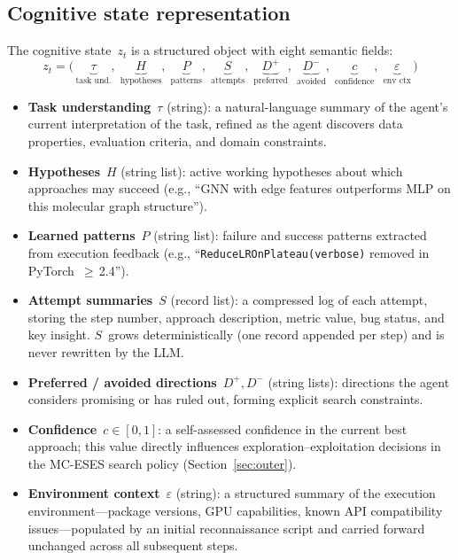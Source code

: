 \documentclass{article} %
\newcommand{\zt}{z_t}
\begin{document}
\subsection{Cognitive state representation}
\label{sec:cognitive_state}

The cognitive state~$\zt$ is a structured object with eight semantic fields:
\begin{equation}
  \zt = \big(\,
  \underbrace{\tau}_{\text{task und.}},\;
  \underbrace{H}_{\text{hypotheses}},\;
  \underbrace{P}_{\text{patterns}},\;
  \underbrace{S}_{\text{attempts}},\;
  \underbrace{D^{+}}_{\text{preferred}},\;
  \underbrace{D^{-}}_{\text{avoided}},\;
  \underbrace{c}_{\text{confidence}},\;
  \underbrace{\varepsilon}_{\text{env ctx}}
  \,\big)
  \label{eq:state}
\end{equation}

\begin{itemize}
  \item \textbf{Task understanding}~$\tau$ (string): a natural-language summary
  of the agent's current interpretation of the task, refined as the agent
  discovers data properties, evaluation criteria, and domain constraints.
  \item \textbf{Hypotheses}~$H$ (string list): active working hypotheses about
  which approaches may succeed (e.g., ``GNN with edge features outperforms MLP
  on this molecular graph structure'').
  \item \textbf{Learned patterns}~$P$ (string list): failure and success
  patterns extracted from execution feedback (e.g.,
  ``\texttt{ReduceLROnPlateau(verbose)} removed in PyTorch~$\geq$\,2.4'').
  \item \textbf{Attempt summaries}~$S$ (record list): a compressed log of each
  attempt, storing the step number, approach description, metric value,
  bug status, and key insight. $S$~grows deterministically (one record appended
  per step) and is never rewritten by the LLM.
  \item \textbf{Preferred / avoided directions}~$D^{+}, D^{-}$ (string lists):
  directions the agent considers promising or has ruled out, forming explicit
  search constraints.
  \item \textbf{Confidence}~$c \in [0, 1]$: a self-assessed confidence in the
  current best approach; this value directly influences exploration--exploitation
  decisions in the MC-ESES search policy (Section~\ref{sec:outer}).
  \item \textbf{Environment context}~$\varepsilon$ (string): a structured
  summary of the execution environment---package versions, GPU capabilities,
  known API compatibility issues---populated by an initial reconnaissance script
  and carried forward unchanged across all subsequent steps.
\end{itemize}
\end{document}
